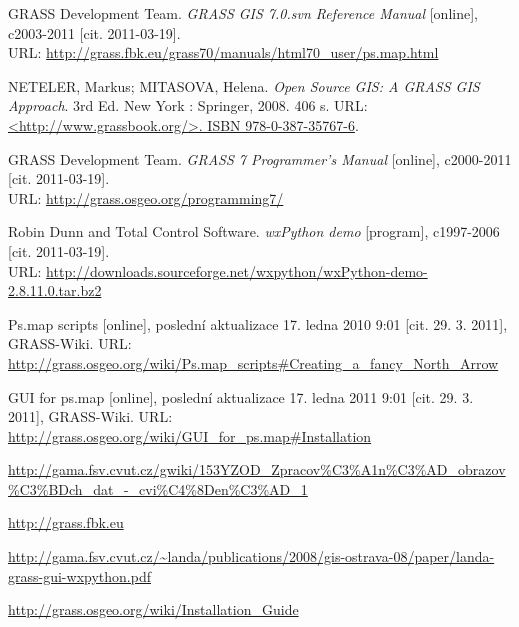 \documentclass[a4paper,12pt,draft]{article}
\begin{document}
\begin{thebibliography}{9}
\label{literatura}
GRASS Development Team. \textit{GRASS GIS 7.0.svn Reference Manual} [online], c2003-2011 [cit. 2011-03-19].\\ URL: \url{http://grass.fbk.eu/grass70/manuals/html70_user/ps.map.html}

NETELER, Markus; MITASOVA, Helena. \textit{Open Source GIS: A GRASS GIS Approach}. 3rd Ed. New York : Springer, 2008. 406 s. URL: \url{<http://www.grassbook.org/>. ISBN 978-0-387-35767-6}.

GRASS Development Team. \textit{GRASS 7 Programmer's Manual} [online], c2000-2011 [cit. 2011-03-19].\\ URL: \url{http://grass.osgeo.org/programming7/}

Robin Dunn and Total Control Software. \textit{wxPython demo} [program], c1997-2006 [cit. 2011-03-19].\\ URL: \url{http://downloads.sourceforge.net/wxpython/wxPython-demo-2.8.11.0.tar.bz2}

Ps.map scripts [online], poslední aktualizace 17. ledna 2010 9:01 [cit. 29. 3. 2011], GRASS-Wiki. URL: \url{http://grass.osgeo.org/wiki/Ps.map_scripts#Creating_a_fancy_North_Arrow}

GUI for ps.map [online], poslední aktualizace 17. ledna 2011 9:01 [cit. 29. 3. 2011], GRASS-Wiki. URL: \url{http://grass.osgeo.org/wiki/GUI_for_ps.map#Installation}

 \url{http://gama.fsv.cvut.cz/gwiki/153YZOD_Zpracov%C3%A1n%C3%AD_obrazov%C3%BDch_dat_-_cvi%C4%8Den%C3%AD_1}

\url{http://grass.fbk.eu}

\url{http://gama.fsv.cvut.cz/~landa/publications/2008/gis-ostrava-08/paper/landa-grass-gui-wxpython.pdf}
% 

\url{http://grass.osgeo.org/wiki/Installation_Guide}

\end{thebibliography}
\end{document}

